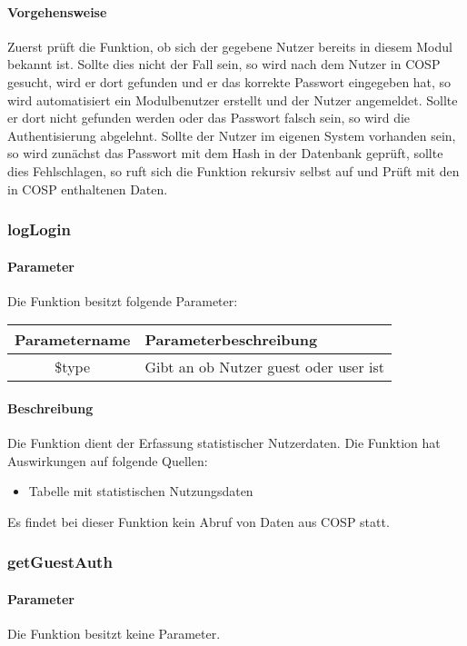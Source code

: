 \paragraph{Vorgehensweise} Zuerst prüft die Funktion, ob sich der gegebene Nutzer bereits in diesem Modul bekannt ist. Sollte dies nicht der Fall sein, so wird nach dem Nutzer in {\glqq COSP\grqq} gesucht, wird er dort gefunden und er das korrekte Passwort eingegeben hat, so wird automatisiert ein Modulbenutzer erstellt und der Nutzer angemeldet. Sollte er dort nicht gefunden werden oder das Passwort falsch sein, so wird die Authentisierung abgelehnt. Sollte der Nutzer im eigenen System vorhanden sein, so wird zunächst das Passwort mit dem Hash in der Datenbank geprüft, sollte dies Fehlschlagen, so ruft sich die Funktion rekursiv selbst auf und Prüft mit den in {\glqq COSP\grqq} enthaltenen Daten.
\subsubsection{logLogin}
\paragraph{Parameter} Die Funktion besitzt folgende Parameter:
\begin{table}[H]
	\begin{tabular}{|c|p{11cm}|}
		\hline
		\textbf{Parametername} & \textbf{Parameterbeschreibung} \\ \hline
		\$type        & Gibt an ob Nutzer {\glqq guest\grqq} oder {\glqq user\grqq} ist \\ \hline
	\end{tabular}
\end{table}
\paragraph{Beschreibung} Die Funktion dient der Erfassung statistischer Nutzerdaten. Die Funktion hat Auswirkungen auf folgende Quellen:
\begin{itemize}
	\item Tabelle mit statistischen Nutzungsdaten
\end{itemize}
Es findet bei dieser Funktion kein Abruf von Daten aus {\glqq COSP\grqq} statt.
\subsubsection{getGuestAuth}
\paragraph{Parameter} Die Funktion besitzt keine Parameter.

